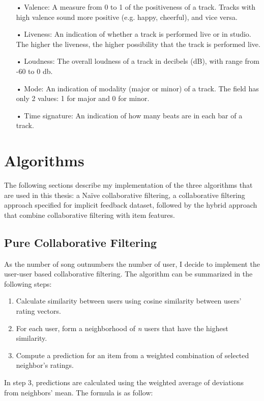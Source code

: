 \begin{itemize}
\item[•] Valence: A measure from 0 to 1 of the positiveness of a track. Tracks with high valence sound more positive (e.g. happy, cheerful), and vice versa.
\item[•] Liveness: An indication of whether a track is performed live or in studio. The higher the liveness, the higher possibility that the track is performed live.
\item[•] Loudness: The overall loudness of a track in decibels (dB), with range from -60 to 0 db. 
\item[•] Mode: An indication of modality (major or minor) of a track. The field has only 2 values: 1 for major and 0 for minor.
\item[•] Time signature: An indication of how many beats are in each bar of a track. 
\end{itemize}

\section{Algorithms}

The following sections describe my implementation of the three algorithms that are used in this thesis: a Na\"ive collaborative filtering, a collaborative filtering approach specified for implicit feedback dataset, followed by the hybrid approach that combine collaborative filtering with item features.

\subsection{Pure Collaborative Filtering}
As the number of song outnumbers the number of user, I decide to implement the user-user based collaborative filtering. The algorithm can be summarized in the following steps:

\begin{enumerate}
	\item Calculate similarity between users using cosine similarity between users' rating vectors. 
	\item For each user, form a neighborhood of \textit{n} users that have the highest similarity.
	\item Compute a prediction for an item from a weighted combination of selected neighbor's ratings. 
\end{enumerate}

In step 3, predictions are calculated using the weighted average of deviations from neighbors' mean. The formula is as follow:

